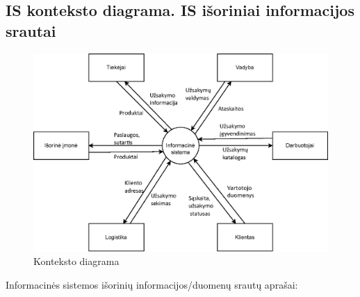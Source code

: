 \documentclass{VUMIFPSkursinis}
\begin{document}
\subsection{IS konteksto diagrama. IS išoriniai informacijos srautai}
\begin{figure}[H]
    \centering
    \includegraphics[scale=1]{img/KontekstoDiagrama2}
    \caption{Konteksto diagrama}
    \label{img:mlp}
\end{figure}
Informacinės sistemos išorinių informacijos/duomenų srautų aprašai:
\end{document}
